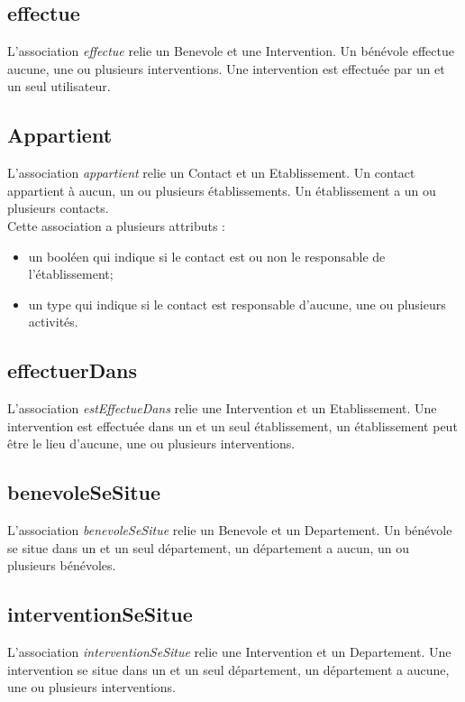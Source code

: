 \documentclass[asi, sansVersion]{picInsa}
\begin{document}
\subsection*{effectue} 

L'association \textit{effectue} relie un Benevole et une Intervention. Un bénévole effectue aucune, une ou plusieurs interventions. Une intervention est effectuée par un et un seul utilisateur. 

\subsection*{Appartient}

L'association \textit{appartient} relie un Contact et un Etablissement. Un contact appartient à aucun, un ou plusieurs établissements. Un établissement a un ou plusieurs contacts.\\
Cette association a plusieurs attributs :
\begin{itemize}
\item un booléen qui indique si le contact est ou non le responsable de l'établissement; 
\item un type qui indique si le contact est responsable d'aucune, une ou plusieurs activités.
\end{itemize}

\subsection*{effectuerDans}

L'association \textit{estEffectueDans} relie une Intervention et un Etablissement. Une intervention est effectuée dans un et un seul établissement, un établissement peut être le lieu d'aucune, une ou plusieurs interventions.

\subsection*{benevoleSeSitue}

L'association \textit{benevoleSeSitue} relie un Benevole et un Departement. Un bénévole se situe dans un et un seul département, un département a aucun, un ou plusieurs bénévoles.

\subsection*{interventionSeSitue}

L'association \textit{interventionSeSitue} relie une Intervention et un Departement. Une intervention se situe dans un et un seul département, un département a aucune, une ou plusieurs interventions.
\end{document}
